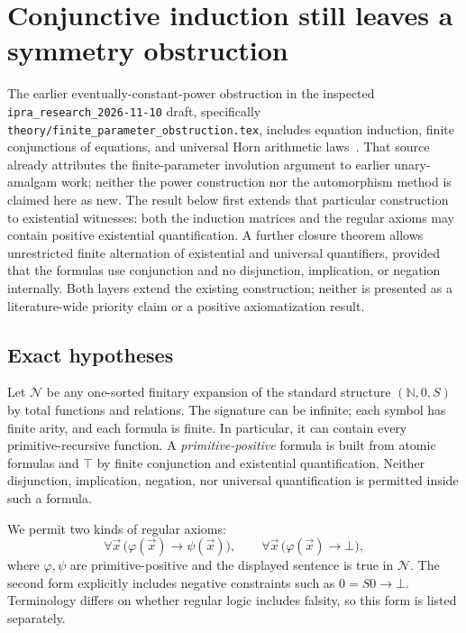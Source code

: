 \documentclass[11pt,letterpaper]{article}
\theoremstyle{definition}\newtheorem{definition}[theorem]{Definition}
\theoremstyle{remark}\newtheorem{remark}[theorem]{Remark}
\begin{document}


\section{Conjunctive induction still leaves a symmetry obstruction}
\label{sec:pp-obstruction}

The earlier eventually-constant-power obstruction in the inspected
\texttt{ipra\_research\_2026-11-10} draft, specifically
\texttt{theory/finite\_parameter\_obstruction.tex}, includes equation
induction, finite conjunctions of equations, and universal Horn
arithmetic laws~\cite{research}.  That source already attributes the finite-parameter
involution argument to earlier unary-amalgam work; neither the power
construction nor the automorphism method is claimed here as new.
The result below first extends that particular construction to existential
witnesses: both the induction matrices and the regular axioms may contain
positive existential quantification.  A further closure theorem allows
unrestricted finite alternation of existential and universal quantifiers,
provided that the formulas use conjunction and no disjunction,
implication, or negation internally.  Both layers extend the existing
construction; neither is presented as a literature-wide priority claim
or a positive axiomatization result.

\subsection{Exact hypotheses}

Let $\mathcal N$ be any one-sorted finitary expansion of the standard
structure $(\mathbb N,0,S)$ by total functions and relations.  The
signature can be infinite; each symbol has finite arity, and each formula
is finite.  In particular, it can contain every primitive-recursive
function.  A \emph{primitive-positive} formula is built from atomic
formulas and $\top$ by finite conjunction and existential quantification.
Neither disjunction, implication, negation, nor universal quantification
is permitted inside such a formula.

We permit two kinds of regular axioms:
\[
 \forall\vec x\,\bigl(\varphi(\vec x)\to\psi(\vec x)\bigr),
 \qquad
 \forall\vec x\,\bigl(\varphi(\vec x)\to\bot\bigr),
 \tag{Reg}\label{eq:pp-regular}
\]
where $\varphi,\psi$ are primitive-positive and the displayed sentence
is true in $\mathcal N$.  The second form explicitly includes negative
constraints such as $0=S0\to\bot$.  Terminology differs on whether
regular logic includes falsity, so this form is listed separately.
\end{document}
